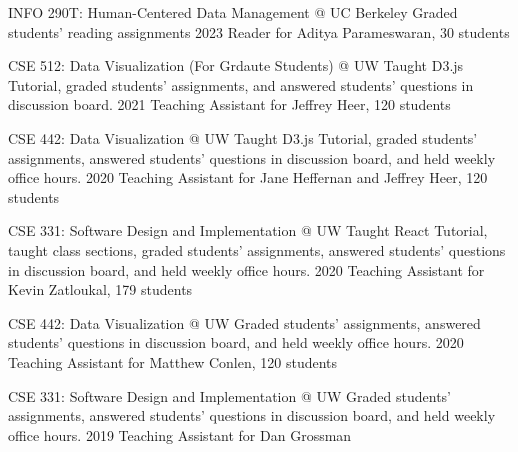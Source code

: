 

\begin{cvpubs}

  \cvteach
    {INFO 290T: Human-Centered Data Management @ UC Berkeley} %
    {Graded students' reading assignments} %
    {2023} %
    {Reader for Aditya Parameswaran, 30 students} %

  \cvteach
    {CSE 512: Data Visualization (For Grdaute Students) @ UW} %
    {Taught D3.js Tutorial, graded students' assignments, and answered students' questions in discussion board.} %
    {2021} %
    {Teaching Assistant for Jeffrey Heer, 120 students} %

  \cvteach
    {CSE 442: Data Visualization @ UW} %
    {Taught D3.js Tutorial, graded students' assignments, answered students' questions in discussion board, and held weekly office hours.} %
    {2020} %
    {Teaching Assistant for Jane Heffernan and Jeffrey Heer, 120 students} %

  \cvteach
    {CSE 331: Software Design and Implementation @ UW} %
    {Taught React Tutorial, taught class sections, graded students' assignments, answered students' questions in discussion board, and held weekly office hours.} %
    {2020} %
    {Teaching Assistant for Kevin Zatloukal, 179 students} %

  \cvteach
    {CSE 442: Data Visualization @ UW} %
    {Graded students' assignments, answered students' questions in discussion board, and held weekly office hours.} %
    {2020} %
    {Teaching Assistant for Matthew Conlen, 120 students} %

  \cvteach
    {CSE 331: Software Design and Implementation @ UW} %
    {Graded students' assignments, answered students' questions in discussion board, and held weekly office hours.} %
    {2019} %
    {Teaching Assistant for Dan Grossman} %
\end{cvpubs}
